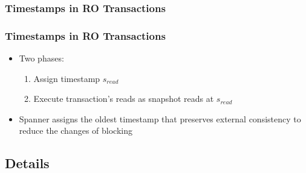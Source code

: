 \documentclass{beamer}
\begin{document}
\subsubsection{Timestamps in RO Transactions}
\begin{frame}
  \frametitle{Timestamps in RO Transactions}
  \begin{itemize}
    \item{Two phases:}
    \begin{enumerate}
      \item{Assign timestamp $s_{read}$}
      \item{Execute transaction's reads as snapshot reads at $s_{read}$}
    \end{enumerate}
    \item{Spanner assigns the oldest timestamp that preserves external consistency
      to reduce the changes of blocking
    }
  \end{itemize}
\end{frame}

\subsection{Details}
\end{document}
